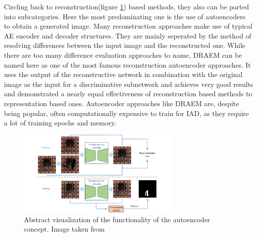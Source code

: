 Circling back to reconstruction(figure \ref{fig:autoencoderviz}) based methods, they also can be parted into subcategories. Here the most predominating one is the use of autoencoders to obtain a generated image. Many 
reconstruction approaches make use of typical AE encoder and decoder structures. They are mainly seperated by the method of resolving differences between the input image and the reconstructed one. 
While there are too many difference evaluation approaches to name, DRAEM \cite{Zavrtanik_2021DRAEM} can be named here as one of the most famous reconstruction autoencoder approaches. It uses 
the output of the reconstructive network in combination with the original image as the input for a discriminative subnetwork and achieves very good results and demonstrated a nearly equal effectiveness 
of reconstruction based methods to representation based ones. Autoencoder approaches like DRAEM are, despite being popular, often computationally expensive to train for IAD, as they require a lot of 
training epochs and memory. %

\begin{figure}[H]
    \centering
    \includegraphics[width=0.7\textwidth]{figures/approachvizgeneral/autoencoderbiz.jpg}
    \caption{Abstract visualization of the functionality of the autoencoder concept. Image taken from \cite{liu2024deep}}
    \label{fig:autoencoderviz}
\end{figure}


